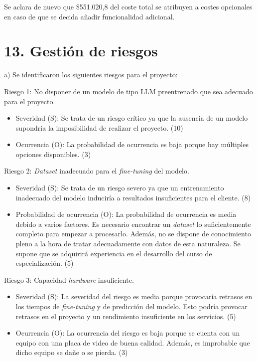 \documentclass[
11pt, %
]{Clases/charter}
\begin{document}
Se aclara de nuevo que \$551.020,8 del coste total se atribuyen a costes opcionales en caso de que se decida añadir funcionalidad adicional.

\section{13. Gestión de riesgos}
\label{sec:riesgos}
a) Se identificaron los siguientes riesgos para el proyecto:

Riesgo 1: No disponer de un modelo de tipo LLM preentrenado que sea adecuado para el proyecto.
\begin{itemize}
	\item Severidad (S): Se trata de un riesgo crítico ya que la ausencia de un modelo supondría la imposibilidad de realizar el proyecto. (10)
	\item Ocurrencia (O): La probabilidad de ocurrencia es baja porque hay múltiples opciones disponibles. (3)
\end{itemize}

Riesgo 2: \textit{Dataset} inadecuado para el \textit{fine-tuning} del modelo.
\begin{itemize}
	\item Severidad (S): Se trata de un riesgo severo ya que un entrenamiento inadecuado del modelo induciría a resultados insuficientes para el cliente. (8)
	\item Probabilidad de ocurrencia (O): La probabilidad de ocurrencia es media debido a varios factores.
	      Es necesario encontrar un \textit{dataset} lo suficientemente completo para empezar a procesarlo.
	      Además, no se dispone de conocimiento pleno a la hora de tratar adecuadamente con datos de esta naturaleza.
	      Se supone que se adquirirá experiencia en el desarrollo del curso de especialización. (5)
\end{itemize}

\pagebreak

Riesgo 3: Capacidad \textit{hardware} insuficiente.
\begin{itemize}
	\item Severidad (S): La severidad del riesgo es media porque provocaría retrasos en los tiempos de \textit{fine-tuning} y de predicción del modelo.
	      Esto podría provocar retrasos en el proyecto y un rendimiento insuficiente en los servicios. (5)
	\item Ocurrencia (O): La ocurrencia del riesgo es baja porque se cuenta con un equipo con una placa de video de buena calidad.
	      Además, es improbable que dicho equipo se dañe o se pierda. (3)
\end{itemize}
\end{document}
